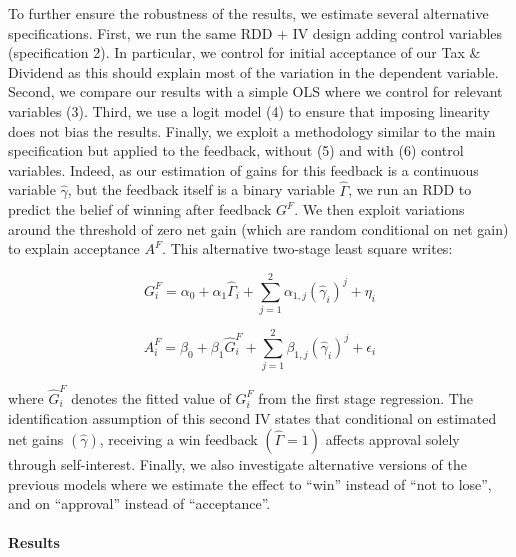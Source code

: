 \documentclass[11pt]{article}
\begin{document}
To further ensure the robustness of the results, we estimate several alternative specifications. First, we run the same RDD + IV design adding control variables (specification 2). In particular, we control for initial acceptance of our Tax \& Dividend as this should explain most of the variation in the dependent variable. Second, we compare our results with a simple OLS where we control for relevant variables (3). Third, we use a logit model (4) to ensure that imposing linearity does not bias the results. Finally, we exploit a methodology similar to the main specification but applied to the feedback, without (5) and with (6) control variables. Indeed, as our estimation of gains for this feedback is a continuous variable $\widehat{\gamma}$, but the feedback itself is a binary variable $\widehat{\Gamma}$, we run an RDD to predict the belief of winning after feedback $G^F$. We then exploit variations around the threshold of zero net gain (which are random conditional on net gain) to explain acceptance $A^F$. This alternative two-stage least square writes:

\begin{equation}
    G_i^F = \alpha_0 + \alpha_1 \widehat{\Gamma}_{i} + \sum_{j=1}^2 \alpha_{1,j} (\widehat{\gamma}_{i})^{j} + \eta_i
    \label{eq:first_stage_parametric_rdd_approve_winner_feedback}
\end{equation}

\vspace{-.0cm}

\begin{equation}
    A_i^F = \beta_0 + \beta_1 \widehat{G}_i^F + \sum_{j=1}^2 \beta_{1,j} (\widehat{\gamma}_{i})^{j} + \epsilon_i
    \label{eq:second_stage_feed_with_rdd_approve_winner}
\end{equation}

\vspace{.5cm}

\noindent
where $\widehat{G}_i^F$ denotes the fitted value of $G_i^F$ from the first stage regression. The identification assumption of this second IV states that conditional on estimated net gains $(\widehat{\gamma})$, receiving a win feedback $(\widehat{\Gamma} = 1)$ affects approval solely through self-interest. Finally, we also investigate alternative versions of the previous models where we estimate the effect to ``win'' instead of ``not to lose'', and on ``approval'' instead of ``acceptance''.

\paragraph{Results}
\end{document}
